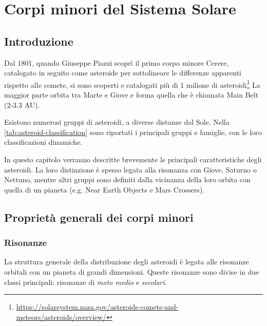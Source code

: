 \documentclass[a4paper,11pt,openright]{book}
\begin{document}
\tableofcontents

\listoftables

\listoffigures


\mainmatter

\chapter{Corpi minori del Sistema Solare}\label{ch:ch_1}

\section{Introduzione}

Dal 1801, quando Giuseppe Piazzi scoprì il primo corpo minore Cerere, catalogato in seguito come asteroide per sottolineare le differenze apparenti rispetto alle comete, si sono scoperti e catalogati più di 1 milione di asteroidi\footnote{\href{https://solarsystem.nasa.gov/asteroids-comets-and-meteors/asteroids/overview/}{https://solarsystem.nasa.gov/asteroids-comets-and-meteors/asteroids/overview/}} La maggior parte orbita tra Marte e Giove e forma quella che è chiamata Main Belt (2-3.3 AU).

Esistono numerosi gruppi di asteroidi, a diverse distanze dal Sole. Nella \cref{tab:asteroid-classification} sono riportati i principali gruppi e famiglie, con le loro classificazioni dinamiche.

In questo capitolo verranno descritte brevemente le principali caratteristiche degli asteroidi. La loro distinzione è spesso legata alla risonanza con Giove, Saturno o Nettuno, mentre altri gruppi sono definiti dalla vicinanza della loro orbita con quella di un pianeta (e.g. Near Earth Objects e Mars Crossers).

\section{Proprietà generali dei corpi minori}


\subsection{Risonanze}
La struttura generale della distribuzione degli asteroidi è legata alle risonanze orbitali con un pianeta di grandi dimensioni. Queste risonanze sono divise in due classi principali: risonanze di \textit{moto medio} e \textit{secolari}.
\end{document}
